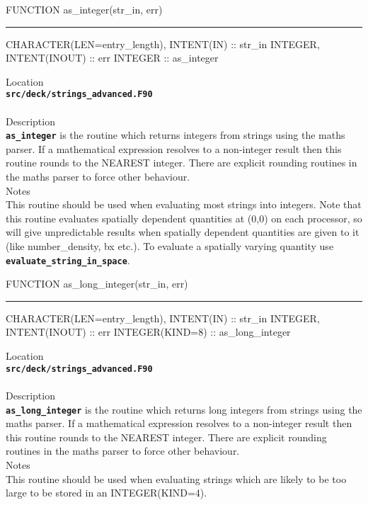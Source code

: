 \documentclass[12pt,a4paper]{article}
\newcommand{\HRule}{\rule[0.3cm]{\linewidth}{0.5mm}}
\newcommand{\inlinecode}[1]{{\color{warwickred} \bf\texttt{#1}}}
\begin{document}
\pagebreak
\begin{codedef}
FUNCTION as_integer(str_in, err)
\HRule
CHARACTER(LEN=entry_length), INTENT(IN) :: str_in
INTEGER, INTENT(INOUT) :: err
INTEGER :: as_integer
\end{codedef}
\vspace{1cm}
{\Large Location\\}
\inlinecode{src/deck/strings\_advanced.F90}\\
\\[0.5cm]
{\Large Description\\}
\inlinecode{as\_integer} is the routine which returns integers from strings
using the maths parser. If a mathematical expression resolves to a non-integer
result then this routine rounds to the NEAREST integer. There are explicit
rounding routines in the maths parser to force other behaviour.
\\[0.5cm]
{\Large Notes\\}
This routine should be used when evaluating most strings into integers. Note
that this routine evaluates spatially dependent quantities at (0,0) on each
processor, so will give unpredictable results when spatially dependent
quantities are given to it (like number\_density, bx etc.). To evaluate a spatially varying
quantity use \inlinecode{evaluate\_string\_in\_space}.

\pagebreak
\begin{codedef}
FUNCTION as_long_integer(str_in, err)
\HRule
CHARACTER(LEN=entry_length), INTENT(IN) :: str_in
INTEGER, INTENT(INOUT) :: err
INTEGER(KIND=8) :: as_long_integer
\end{codedef}
\vspace{1cm}
{\Large Location\\}
\inlinecode{src/deck/strings\_advanced.F90}\\
\\[0.5cm]
{\Large Description\\}
\inlinecode{as\_long\_integer} is the routine which returns long integers from
strings using the maths parser. If a mathematical expression resolves to a
non-integer result then this routine rounds to the NEAREST integer. There are
explicit rounding routines in the maths parser to force other behaviour.
\\[0.5cm]
{\Large Notes\\}
This routine should be used when evaluating strings which are likely to be too
large to be stored in an INTEGER(KIND=4).
\end{document}
